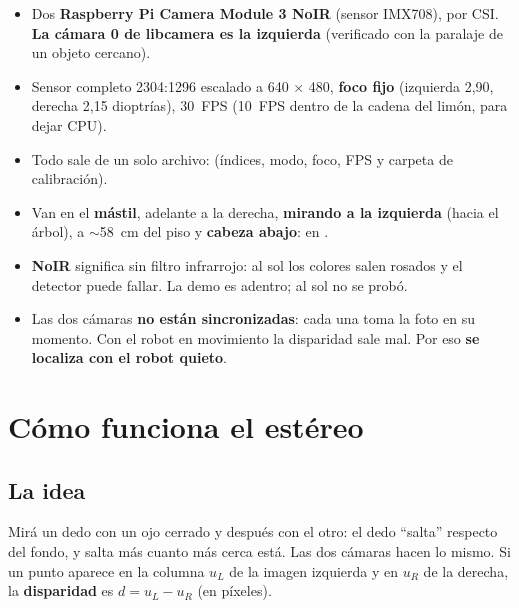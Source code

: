 \begin{itemize}
  \item Dos \textbf{Raspberry Pi Camera Module 3 NoIR} (sensor IMX708), por CSI. \textbf{La cámara 0 de libcamera es la
        izquierda} (verificado con la paralaje de un objeto cercano).
  \item Sensor completo 2304:1296 escalado a 640 × 480, \textbf{foco fijo} (izquierda 2,90, derecha 2,15 dioptrías),
        30~FPS (10~FPS dentro de la cadena del limón, para dejar CPU).
  \item Todo sale de un solo archivo:  (índices, modo, foco, FPS y carpeta de calibración).
  \item Van en el \textbf{mástil}, adelante a la derecha, \textbf{mirando a la izquierda} (hacia el árbol), a
        $\sim$58~cm del piso y \textbf{cabeza abajo}:  en .
  \item \textbf{NoIR} significa sin filtro infrarrojo: al sol los colores salen rosados y el detector puede fallar.
        La demo es adentro; al sol no se probó.
  \item Las dos cámaras \textbf{no están sincronizadas}: cada una toma la foto en su momento. Con el robot en
        movimiento la disparidad sale mal. Por eso \textbf{se localiza con el robot quieto}.
\end{itemize}

\section{Cómo funciona el estéreo}

\subsection{La idea}
Mirá un dedo con un ojo cerrado y después con el otro: el dedo ``salta'' respecto del fondo, y salta más cuanto más
cerca está. Las dos cámaras hacen lo mismo. Si un punto aparece en la columna $u_L$ de la imagen izquierda y en $u_R$
de la derecha, la \textbf{disparidad} es $d = u_L - u_R$ (en píxeles).

